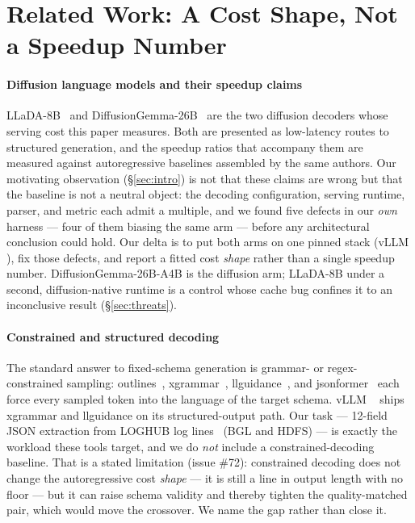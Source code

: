 \section{Related Work: A Cost Shape, Not a Speedup Number}
\label{sec:related}

\paragraph{Diffusion language models and their speedup claims}
LLaDA-8B~\cite{llada2025} and DiffusionGemma-26B~\cite{diffusiongemma} are the
two diffusion decoders whose serving cost this paper measures. Both are
presented as low-latency routes to structured generation, and the speedup
ratios that accompany them are measured against autoregressive baselines
assembled by the same authors. Our motivating observation
(\S\ref{sec:intro}) is not that these claims are wrong but that the baseline
is not a neutral object: the decoding configuration, serving runtime, parser,
and metric each admit a multiple, and we found five defects in our
\emph{own} harness --- four of them biasing the same arm --- before any
architectural conclusion could hold. Our delta is to put both arms on one
pinned stack (vLLM \vllmVersion), fix those defects, and report a fitted cost
\emph{shape} rather than a single speedup number. DiffusionGemma-26B-A4B is
the diffusion arm; LLaDA-8B under a second, diffusion-native runtime is a
control whose cache bug confines it to an inconclusive result
(\S\ref{sec:threats}).

\paragraph{Constrained and structured decoding}
The standard answer to fixed-schema generation is grammar- or
regex-constrained sampling: outlines~\cite{outlines2024},
xgrammar~\cite{xgrammar2024}, llguidance~\cite{llguidance}, and
jsonformer~\cite{jsonformer} each force every sampled token into the language
of the target schema. vLLM \vllmVersion~\cite{vllm2023} ships xgrammar and
llguidance on its structured-output path. Our task --- 12-field JSON
extraction from LOGHUB log lines~\cite{loghub} (BGL and HDFS) --- is exactly
the workload these tools target, and we do \emph{not} include a
constrained-decoding baseline. That is a stated limitation (issue \#72):
constrained decoding does not change the autoregressive cost \emph{shape} ---
it is still a line in output length with no floor --- but it can raise schema
validity and thereby tighten the quality-matched pair, which would move the
crossover. We name the gap rather than close it.


